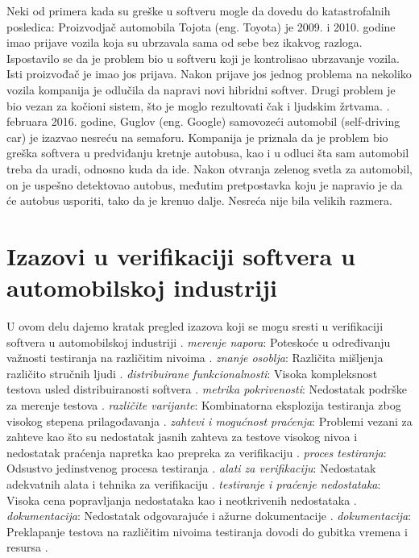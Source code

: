 \documentclass[a4paper]{article}
\begin{document}
\bigbreak
Neki od primera kada su greške u softveru mogle da dovedu do katastrofalnih posledica:
\bigbreak
Proizvodjač automobila Tojota (eng. Toyota) je 2009. i 2010. godine imao prijave vozila koja su ubrzavala sama od sebe bez ikakvog razloga. Ispostavilo se da je problem bio u softveru koji je kontrolisao ubrzavanje vozila. Isti proizvođač je imao jos prijava. Nakon prijave jos jednog problema na nekoliko vozila kompanija je odlučila da napravi novi hibridni softver. Drugi problem je bio vezan za kočioni sistem, što je moglo rezultovati čak i ljudskim žrtvama. 
. februara 2016. godine, Guglov (eng. Google) samovozeći automobil (self-driving car) je izazvao nesreću na semaforu. Kompanija je priznala da je problem bio greška softvera u predviđanju kretnje autobusa, kao i u odluci šta sam automobil treba da uradi, odnosno kuda da ide. Nakon otvranja zelenog svetla za automobil, on je uspešno detektovao autobus, međutim pretpostavka koju je napravio je da će autobus usporiti, tako da je krenuo dalje. Nesreća nije bila velikih razmera.

\section{Izazovi u verifikaciji softvera u automobilskoj industriji}
\label{sec:izazovi}

U ovom delu dajemo kratak pregled izazova koji se mogu sresti u verifikaciji softvera u automobilskoj industriji \cite{ref13}\cite{ref14}\cite{ref15}.
\bigbreak
\textit{merenje napora}: Poteskoće u određivanju važnosti testiranja na različitim nivoima \cite{ref14}.
\bigbreak
\textit{znanje osoblja}: Različita mišljenja različito stručnih ljudi \cite{ref14}.
\bigbreak
\textit{distribuirane funkcionalnosti}: Visoka kompleksnost testova usled distribuiranosti softvera \cite{ref14}.
\bigbreak
\textit{metrika pokrivenosti}: Nedostatak podrške za merenje testova \cite{ref14}. 
\bigbreak
\textit{različite varijante}: Kombinatorna eksplozija testiranja zbog visokog stepena prilagođavanja \cite{ref14}.
\bigbreak
\textit{zahtevi i mogućnost praćenja}: Problemi vezani za zahteve kao što su nedostatak jasnih zahteva za testove visokog nivoa i nedostatak praćenja napretka kao prepreka za verifikaciju \cite{ref13}.
\bigbreak
\textit{proces testiranja}: Odsustvo jedinstvenog procesa testiranja \cite{ref13}.
\bigbreak
\textit{alati za verifikaciju}: Nedostatak adekvatnih alata i tehnika za verifikaciju \cite{ref13}.
\bigbreak
\textit{testiranje i praćenje nedostataka}: Visoka cena popravljanja nedostataka kao i neotkrivenih nedostataka \cite{ref13}.
\bigbreak
\textit{dokumentacija}: Nedostatak odgovarajuće i ažurne dokumentacije \cite{ref13}.
\bigbreak
\textit{dokumentacija}: Preklapanje testova na različitim nivoima testiranja dovodi do gubitka vremena i resursa \cite{ref15}.
\end{document}
